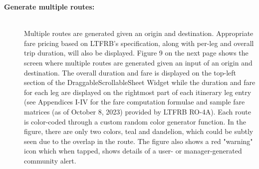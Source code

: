 \documentclass[journal]{./IEEE/IEEEtran}
\begin{document}
\begin{description}

    \item[\textbf{Generate multiple routes:}] \hfill \\
        Multiple routes are generated given an origin and destination. Appropriate fare pricing based on LTFRB's specification, along with per-leg and overall trip duration, will also be displayed.
Figure 9 on the next page shows the screen where multiple routes are generated given an input of an origin and destination.
The overall duration and fare is displayed on the top-left section of the DraggableScrollableSheet Widget while the duration and fare for each leg are displayed on the rightmost part of each itinerary leg entry (see Appendices I-IV for the fare computation formulae and sample fare matrices (as of October 8, 2023) provided by LTFRB RO-4A).
Each route is color-coded through a custom random color generator function. In the figure, there are only two colors, teal and dandelion, which could be subtly seen due to the overlap in the route.
The figure also shows a red "warning" icon which when tapped, shows details of a user- or manager-generated community alert.

\newpage


\end{description}
\end{document}
